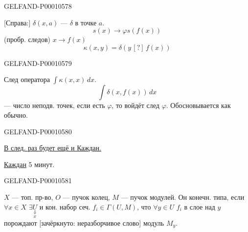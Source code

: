 \begin{GelfandAdjacentEvidence}{GELFAND-P000105}{78}

[Справа:] $\delta(x,a)$ — $\delta$ в точке $a$.
\begin{equation*}s(x)\longrightarrow\varphi s(f(x))\end{equation*}
(пробр. следов) $x\longrightarrow f(x)$
\begin{equation*}\kappa(x,y)=\delta(y\,{[?]}\,f(x))\end{equation*}
\end{GelfandAdjacentEvidence}
\begin{GelfandAdjacentEvidence}{GELFAND-P000105}{79}

След оператора $\int\kappa(x,x)\,dx$.
\begin{equation*}\int\delta(x,f(x))\,dx\end{equation*}
— число неподв. точек, если есть $\varphi$, то войдёт след $\varphi$. Обосновывается как обычно.
\end{GelfandAdjacentEvidence}
\begin{GelfandAdjacentEvidence}{GELFAND-P000105}{80}


\underline{В след. раз будет ещё и Каждан.}
\par\underline{Каждан} 5 минут.
\end{GelfandAdjacentEvidence}
\begin{GelfandAdjacentEvidence}{GELFAND-P000105}{81}

$X$ — топ. пр-во, $O$ — пучок колец, $M$ — пучок модулей.
Он конечн. типа, если $\forall x\in X$ $\exists\underset{x}{\underset{\Downarrow}{U}}$ и кон. набор сеч.
$f_i\in\Gamma(U,M)$, что $\forall y\in U$ $f_i$ в слое над $y$
порождают [зачёркнуто: неразборчивое слово] модуль $M_y$.
\end{GelfandAdjacentEvidence}
